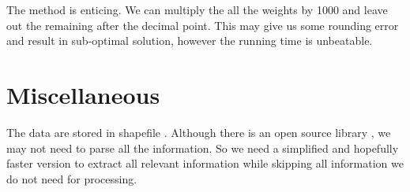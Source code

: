 \documentclass[11pt]{article}
\begin{document}
The method \cite{Thorup:1999} is enticing.  We can multiply the all
the weights by 1000 and leave out the remaining after the decimal
point.  This may give us some rounding error and result in
sub-optimal solution, however the running time is unbeatable.

\section{Miscellaneous}
\label{sec-4}

The data are stored in shapefile \cite{Wikipedia:shapefile}.
Although there is an open source library \cite{Warmerdam}, we may
not need to parse all the information.  So we need a simplified and
hopefully faster version to extract all relevant information while
skipping all information we do not need for processing.

\small\printbibliography
\end{document}
